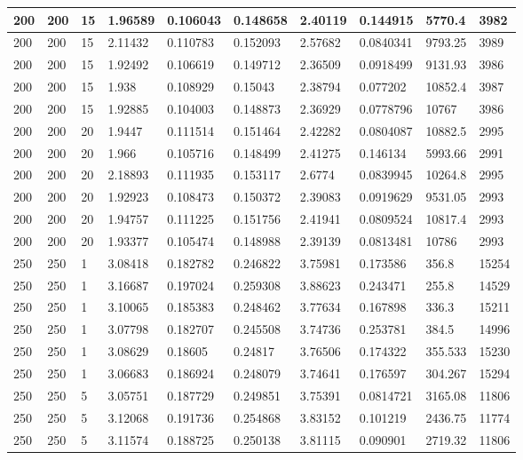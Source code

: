 \begin{landscape}
\begin{longtable}{ | l | l | l | l | l | l | l | l | l | l | }
200 & 200 & 15 & 1.96589 & 0.106043 & 0.148658 & 2.40119 & 0.144915 & 5770.4 & 3982\\ \hline
200 & 200 & 15 & 2.11432 & 0.110783 & 0.152093 & 2.57682 & 0.0840341 & 9793.25 & 3989\\ \hline
200 & 200 & 15 & 1.92492 & 0.106619 & 0.149712 & 2.36509 & 0.0918499 & 9131.93 & 3986\\ \hline
200 & 200 & 15 & 1.938 & 0.108929 & 0.15043 & 2.38794 & 0.077202 & 10852.4 & 3987\\ \hline
200 & 200 & 15 & 1.92885 & 0.104003 & 0.148873 & 2.36929 & 0.0778796 & 10767 & 3986\\ \hline
200 & 200 & 20 & 1.9447 & 0.111514 & 0.151464 & 2.42282 & 0.0804087 & 10882.5 & 2995\\ \hline
200 & 200 & 20 & 1.966 & 0.105716 & 0.148499 & 2.41275 & 0.146134 & 5993.66 & 2991\\ \hline
200 & 200 & 20 & 2.18893 & 0.111935 & 0.153117 & 2.6774 & 0.0839945 & 10264.8 & 2995\\ \hline
200 & 200 & 20 & 1.92923 & 0.108473 & 0.150372 & 2.39083 & 0.0919629 & 9531.05 & 2993\\ \hline
200 & 200 & 20 & 1.94757 & 0.111225 & 0.151756 & 2.41941 & 0.0809524 & 10817.4 & 2993\\ \hline
200 & 200 & 20 & 1.93377 & 0.105474 & 0.148988 & 2.39139 & 0.0813481 & 10786 & 2993\\ \hline
250 & 250 & 1 & 3.08418 & 0.182782 & 0.246822 & 3.75981 & 0.173586 & 356.8 & 15254\\ \hline
250 & 250 & 1 & 3.16687 & 0.197024 & 0.259308 & 3.88623 & 0.243471 & 255.8 & 14529\\ \hline
250 & 250 & 1 & 3.10065 & 0.185383 & 0.248462 & 3.77634 & 0.167898 & 336.3 & 15211\\ \hline
250 & 250 & 1 & 3.07798 & 0.182707 & 0.245508 & 3.74736 & 0.253781 & 384.5 & 14996\\ \hline
250 & 250 & 1 & 3.08629 & 0.18605 & 0.24817 & 3.76506 & 0.174322 & 355.533 & 15230\\ \hline
250 & 250 & 1 & 3.06683 & 0.186924 & 0.248079 & 3.74641 & 0.176597 & 304.267 & 15294\\ \hline
250 & 250 & 5 & 3.05751 & 0.187729 & 0.249851 & 3.75391 & 0.0814721 & 3165.08 & 11806\\ \hline
250 & 250 & 5 & 3.12068 & 0.191736 & 0.254868 & 3.83152 & 0.101219 & 2436.75 & 11774\\ \hline
250 & 250 & 5 & 3.11574 & 0.188725 & 0.250138 & 3.81115 & 0.090901 & 2719.32 & 11806\\ \hline

\end{longtable}
\end{landscape}
